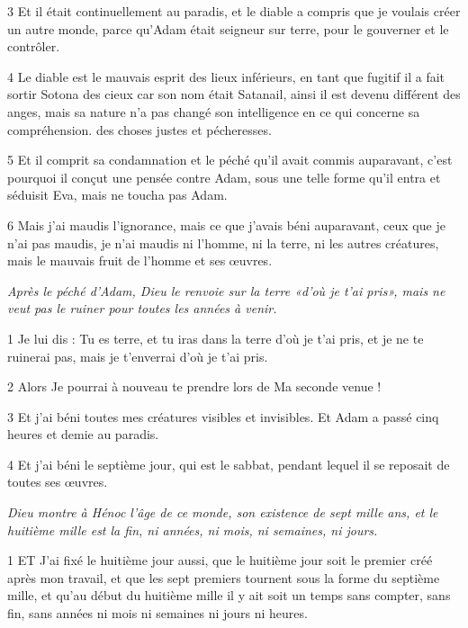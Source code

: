 \par 3 Et il était continuellement au paradis, et le diable a compris que je voulais créer un autre monde, parce qu'Adam était seigneur sur terre, pour le gouverner et le contrôler.

\par 4 Le diable est le mauvais esprit des lieux inférieurs, en tant que fugitif il a fait sortir Sotona des cieux car son nom était Satanail, ainsi il est devenu différent des anges, mais sa nature n'a pas changé son intelligence en ce qui concerne sa compréhension. des choses justes et pécheresses.

\par 5 Et il comprit sa condamnation et le péché qu'il avait commis auparavant, c'est pourquoi il conçut une pensée contre Adam, sous une telle forme qu'il entra et séduisit Eva, mais ne toucha pas Adam.

\par 6 Mais j'ai maudis l'ignorance, mais ce que j'avais béni auparavant, ceux que je n'ai pas maudis, je n'ai maudis ni l'homme, ni la terre, ni les autres créatures, mais le mauvais fruit de l'homme et ses œuvres.


\par \textit{Après le péché d'Adam, Dieu le renvoie sur la terre «d'où je t'ai pris», mais ne veut pas le ruiner pour toutes les années à venir.}

\par 1 Je lui dis : Tu es terre, et tu iras dans la terre d'où je t'ai pris, et je ne te ruinerai pas, mais je t'enverrai d'où je t'ai pris.

\par 2 Alors Je pourrai à nouveau te prendre lors de Ma seconde venue !

\par 3 Et j'ai béni toutes mes créatures visibles et invisibles. Et Adam a passé cinq heures et demie au paradis.

\par 4 Et j'ai béni le septième jour, qui est le sabbat, pendant lequel il se reposait de toutes ses œuvres.


\par \textit{Dieu montre à Hénoc l'âge de ce monde, son existence de sept mille ans, et le huitième mille est la fin, ni années, ni mois, ni semaines, ni jours.}

\par 1 ET J'ai fixé le huitième jour aussi, que le huitième jour soit le premier créé après mon travail, et que les sept premiers tournent sous la forme du septième mille, et qu'au début du huitième mille il y ait soit un temps sans compter, sans fin, sans années ni mois ni semaines ni jours ni heures.


